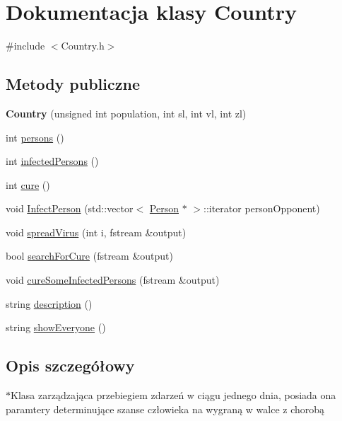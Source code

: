 \hypertarget{classCountry}{}\section{Dokumentacja klasy Country}
\label{classCountry}


{\ttfamily \#include $<$Country.\+h$>$}

\subsection*{Metody publiczne}
\begin{DoxyCompactItemize}
\item 
{\bfseries Country} (unsigned int population, int sl, int vl, int zl)\hypertarget{classCountry_afc0bccd7503b1878f47d816aad1be547}{}\label{classCountry_afc0bccd7503b1878f47d816aad1be547}

\item 
int \hyperlink{classCountry_ab1dd10f4a0d9d1cf53fb8a9f4079de93}{persons} ()
\item 
int \hyperlink{classCountry_a3b8ee891f42aed5f438e564df7bf3b0a}{infected\+Persons} ()
\item 
int \hyperlink{classCountry_a464c5b103990dfab70b50217edb60876}{cure} ()
\item 
void \hyperlink{classCountry_a5c46c5155c99175ffb3acef946312be0}{Infect\+Person} (std\+::vector$<$ \hyperlink{classPerson}{Person} $\ast$ $>$\+::iterator person\+Opponent)
\item 
void \hyperlink{classCountry_aa8fe23fc3002c75b93946cae54c4f202}{spread\+Virus} (int i, fstream \&output)
\item 
bool \hyperlink{classCountry_aceb291a044a495483951745eecece744}{search\+For\+Cure} (fstream \&output)
\item 
void \hyperlink{classCountry_a87a885d659d7e47e405d5d445fd4f0ee}{cure\+Some\+Infected\+Persons} (fstream \&output)
\item 
string \hyperlink{classCountry_a15d7e9b23f141f837fec76cedd76683b}{description} ()
\item 
string \hyperlink{classCountry_a167fa855a40dd3bb0274ee8c01c994c8}{show\+Everyone} ()
\end{DoxyCompactItemize}


\subsection{Opis szczegółowy}
$\ast$\+Klasa zarządzająca przebiegiem zdarzeń w ciągu jednego dnia, posiada ona paramtery determinujące szanse człowieka na wygraną w walce z chorobą 

